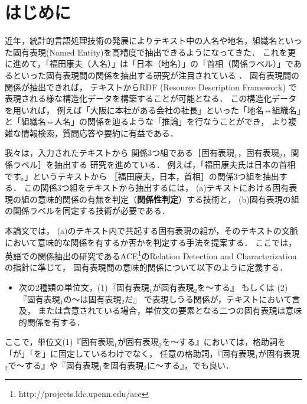 \documentclass[japanese]{jnlp_1.4}
\begin{document}
\maketitle


\section{はじめに}
\label{hajimeni}

近年，統計的言語処理技術の発展によりテキスト中の人名や地名，組織名といった固有表現(Named Entity)を高精度で抽出できるようになってきた．
これを更に進めて，「福田康夫（人名）」は「日本（地名）」の「首相（関係ラベル）」であるといった固有表現間の関係を抽出する研究が注目されている
\cite{brin1998epa,agichtein2000ser,hasegawa2004dra,zelenko2003kmr}．
固有表現間の関係が抽出できれば，
テキストからRDF (Resource Description Framework) で表現される様な構造化データを構築することが可能となる．
この構造化データを用いれば，
例えば「大阪に本社がある会社の社長」といった「地名⇔組織名」と「組織名⇔人名」の関係を辿るような「推論」を行なうことができ，
より複雑な情報検索，質問応答や要約に有益である．

我々は，入力されたテキストから
関係3つ組である［固有表現$_{1}$，固有表現$_{2}$，関係ラベル］を抽出する
研究を進めている．
例えば，「福田康夫氏は日本の首相です。」というテキストから
［福田康夫，日本，首相］の関係3つ組を抽出する．
この関係3つ組をテキストから抽出するには，
(a)テキストにおける固有表現の組の意味的関係の有無を判定（{\bf 関係性判定}）する技術と，
(b)固有表現の組の関係ラベルを同定する技術が必要である．

本論文では，
(a)のテキスト内で共起する固有表現の組が，そのテキストの文脈において意味的な関係を有するか否かを判定する手法を提案する．
ここでは，英語での関係抽出の研究であるACE\footnote{http://projects.ldc.upenn.edu/ace}のRelation Detection and Characterizationの指針に準じて，
固有表現間の意味的関係について以下のように定義する．

\vspace{1\baselineskip}
\begin{itemize}
\item 次の2種類の単位文，(1)『固有表現$_{1}$が固有表現$_{2}$を〜する』
もしくは
(2)『固有表現$_{1}$の〜は固有表現$_{2}$だ』
で表現しうる関係が，テキストにおいて言及，
または含意されている場合，単位文の要素となる二つの固有表現は意味的関係を有する．
\end{itemize}
\vspace{1\baselineskip}

ここで，単位文(1)『固有表現$_{1}$が固有表現$_{2}$を〜する』においては，格助詞を「が」「を」に固定しているわけでなく，
任意の格助詞，『固有表現$_{1}$が固有表現$_{2}$で〜する』や『固有表現$_{1}$を固有表現$_{2}$に〜する』，でも良い．
\end{document}
